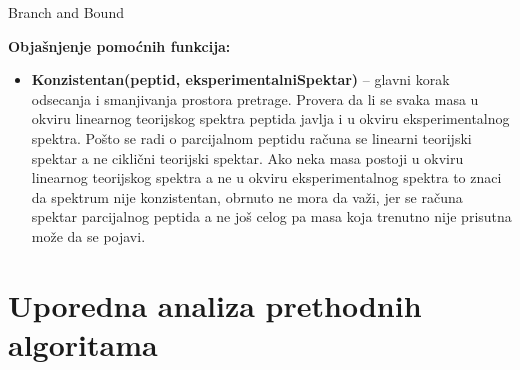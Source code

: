 \documentclass[12pt,oneside]{memoir}
\begin{document}
\begin{algorithm}[H]
\label{alg:branch_and_bound}
\caption{Branch and Bound}
\SetAlgoLined
\DontPrintSemicolon
{}
\end{algorithm}

\noindent
\textbf{Objašnjenje pomoćnih funkcija:}
\begin{itemize}
  \item \textbf{Konzistentan(peptid, eksperimentalniSpektar)} – glavni korak odsecanja i smanjivanja prostora pretrage.  Provera da li se svaka masa u okviru linearnog teorijskog spektra peptida javlja i u okviru eksperimentalnog spektra. Pošto se radi o parcijalnom peptidu računa se linearni teorijski spektar a ne ciklični teorijski spektar. Ako neka masa postoji u okviru linearnog teorijskog spektra a ne u okviru eksperimentalnog spektra to znaci da spektrum nije konzistentan, obrnuto ne mora da važi, jer se računa spektar parcijalnog peptida a ne još celog pa masa koja trenutno nije prisutna može da se pojavi.
\end{itemize}

\section{Uporedna analiza prethodnih algoritama}
\end{document}

